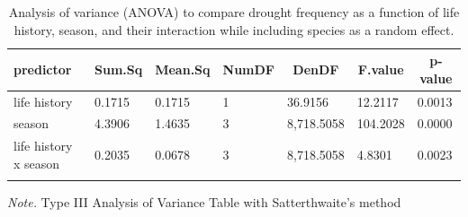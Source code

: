 \documentclass[man,floatsintext]{apa6}
\theoremstyle{definition}
\theoremstyle{definition}
\theoremstyle{definition}
\theoremstyle{remark}
\begin{document}
\begin{table}[tbp]
\begin{center}
\begin{threeparttable}
\caption{\label{tab:anovatable}Analysis of variance (ANOVA) to compare drought frequency as a function of life history, season, and their interaction while including species as a random effect.}
\begin{tabular}{lllllll}
\toprule
predictor & \multicolumn{1}{c}{Sum.Sq} & \multicolumn{1}{c}{Mean.Sq} & \multicolumn{1}{c}{NumDF} & \multicolumn{1}{c}{DenDF} & \multicolumn{1}{c}{F.value} & \multicolumn{1}{c}{p-value}\\
\midrule
life history & 0.1715 & 0.1715 & 1 & 36.9156 & 12.2117 & 0.0013\\
season & 4.3906 & 1.4635 & 3 & 8,718.5058 & 104.2028 & 0.0000\\
life history x season & 0.2035 & 0.0678 & 3 & 8,718.5058 & 4.8301 & 0.0023\\
\bottomrule
\addlinespace
\end{tabular}
\begin{tablenotes}[para]
\normalsize{\textit{Note.} Type III Analysis of Variance Table with Satterthwaite's method}
\end{tablenotes}
\end{threeparttable}
\end{center}
\end{table}
\end{document}
